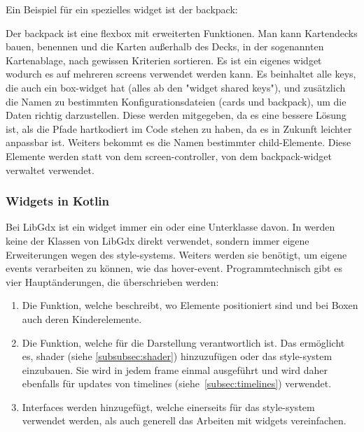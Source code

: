 Ein Beispiel für ein spezielles widget ist der backpack:
Der backpack ist eine flexbox mit erweiterten Funktionen.
Man kann Kartendecks bauen, benennen und die Karten außerhalb des Decks, in der sogenannten Kartenablage, nach gewissen Kriterien sortieren.
Es ist ein eigenes widget wodurch es auf mehreren screens verwendet werden kann.
Es beinhaltet alle keys, die auch ein box-widget hat (alles ab den "widget shared keys"), und zusätzlich die Namen zu bestimmten Konfigurationsdateien (cards und backpack), um die Daten richtig darzustellen.
Diese werden mitgegeben, da es eine bessere Lösung ist, als die Pfade hartkodiert im Code stehen zu haben, da es in Zukunft leichter anpassbar ist.
Weiters bekommt es die Namen bestimmter child-Elemente.
Diese Elemente werden statt von dem screen-controller, von dem backpack-widget verwaltet \bzw verwendet.

\renewcommand{\kapitelautor}{Autor: Felix Zwickelstorfer}
\subsubsection{Widgets in Kotlin}\label{subsubsec:widgetsinkotlin}
\renewcommand{\kapitelautor}{Autor: Felix Zwickelstorfer}
Bei LibGdx ist ein widget immer ein  oder eine Unterklasse davon.
In \FF werden keine der Klassen von LibGdx direkt verwendet, sondern immer eigene Erweiterungen \zB wegen des style-systems.
Weiters werden sie benötigt, um eigene events verarbeiten zu können, wie das hover-event.
Programmtechnisch gibt es vier Hauptänderungen, die überschrieben werden:
\begin{enumerate}
    \item Die  Funktion, welche beschreibt, wo Elemente positioniert sind und bei Boxen auch deren Kinderelemente.
    \item Die  Funktion, welche für die Darstellung verantwortlich ist. Das ermöglicht es, shader (siehe \ref{subsubsec:shader}) hinzuzufügen oder das style-system einzubauen.
    Sie wird in jedem frame einmal ausgeführt und wird daher ebenfalls für updates von timelines (siehe~\ref{subsec:timelines}) verwendet.
    \item Interfaces werden hinzugefügt, welche einerseits für das style-system verwendet werden, als auch generell das Arbeiten mit widgets vereinfachen.
\end{enumerate}
\renewcommand{\kapitelautor}{Autor: Felix Zwickelstorfer}
